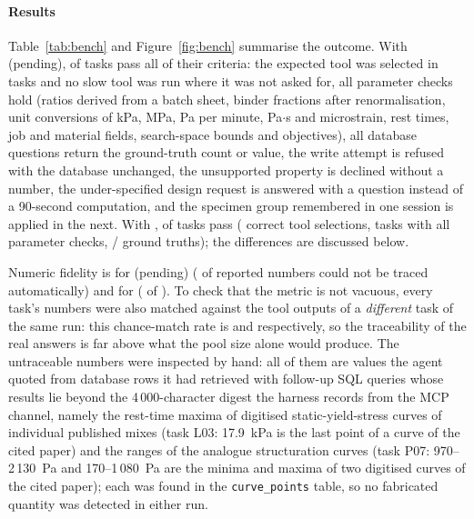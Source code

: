 \documentclass[preprint,12pt]{elsarticle}
\providecommand{\nbenchCxModel}{(pending)}
\begin{document}
\begin{table}[t]
\centering\small
\caption{Benchmark results per task group after the provider fixes described in the text: tasks passed (all criteria), mean numeric fidelity (fraction of reported numbers traceable to the prompt, a tool argument or a tool result) and median wall time per task in seconds.}
\label{tab:bench}

\end{table}

\paragraph{Results} Table~\ref{tab:bench} and Figure~\ref{fig:bench} summarise the outcome. With \nbenchCxModel{}, \nbenchCxPassn{} of \nbenchCxN{} tasks pass all of their criteria: the expected tool was selected in \nbenchCxToolok{} tasks and no slow tool was run where it was not asked for, all \nbenchCxNchecks{} parameter checks hold (ratios derived from a batch sheet, binder fractions after renormalisation, unit conversions of kPa, MPa, Pa per minute, Pa$\cdot$s and microstrain, rest times, job and material fields, search-space bounds and objectives), all \nbenchCxTruthn{} database questions return the ground-truth count or value, the write attempt is refused with the database unchanged, the unsupported property is declined without a number, the under-specified design request is answered with a question instead of a 90-second computation, and the specimen group remembered in one session is applied in the next. With \nbenchCsModel{}, \nbenchCsPassn{} of \nbenchCsN{} tasks pass (\nbenchCsToolok{} correct tool selections, \nbenchCsParamok{} tasks with all parameter checks, \nbenchCsTruthok{}/\nbenchCsTruthn{} ground truths); the differences are discussed below.

Numeric fidelity is \nbenchCxFidelity{} for \nbenchCxModel{} (\nbenchCxNuntraced{} of \nbenchCxNnumbers{} reported numbers could not be traced automatically) and \nbenchCsFidelity{} for \nbenchCsModel{} (\nbenchCsNuntraced{} of \nbenchCsNnumbers{}). To check that the metric is not vacuous, every task's numbers were also matched against the tool outputs of a \emph{different} task of the same run: this chance-match rate is \nbenchCxControl{} and \nbenchCsControl{} respectively, so the traceability of the real answers is far above what the pool size alone would produce. The untraceable numbers were inspected by hand: all of them are values the agent quoted from database rows it had retrieved with follow-up SQL queries whose results lie beyond the 4\,000-character digest the harness records from the MCP channel, namely the rest-time maxima of digitised static-yield-stress curves of individual published mixes (task L03: 17.9~kPa is the last point of a curve of the cited paper) and the ranges of the analogue structuration curves (task P07: 970--2\,130~Pa and 170--1\,080~Pa are the minima and maxima of two digitised curves of the cited paper); each was found in the \texttt{curve\_points} table, so no fabricated quantity was detected in either run.
\end{document}

